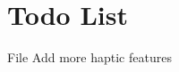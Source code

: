 \chapter{Todo List}
\hypertarget{todo}{}\label{todo}

\begin{DoxyRefList}
\item[File \doxylink{_common_8h}{Common.h} ]\label{todo__todo000001}%
%
Add more haptic features
\end{DoxyRefList}